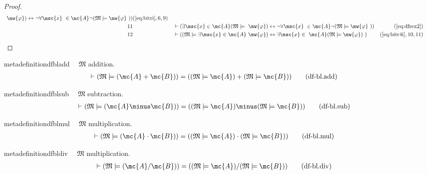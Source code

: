 \begin{proof}
\begin{align}
     ~\mw{\varphi} ) \leftrightarrow \lnot \forall \msc{x}
     ~\in \mc{A} \lnot ( \mathfrak{M} \models \mw{\varphi}
     ~) )&(\mbox{\ref{eq:bitri}},6,9)\notag
  \\ 11 &&  & \vdash ( \exists \msc{x} \in \mc{A} ( \mathfrak{M} \models
     ~\mw{\varphi} ) \leftrightarrow \lnot \forall \msc{x}
     ~\in \mc{A} \lnot ( \mathfrak{M} \models \mw{\varphi}
     ~) )&(\mbox{\ref{eq:dfrex2}})\notag
  \\ 12 &&  & \vdash ( ( \mathfrak{M} \models \exists \msc{x} \in \mc{A}
     ~\mw{\varphi} ) \leftrightarrow \exists \msc{x} \in
     ~\mc{A} ( \mathfrak{M} \models \mw{\varphi} )
     ~)&(\mbox{\ref{eq:bitr4i}},10,11)\notag
\end{align}
\end{proof}

\begin{restatable}{metadefinition}{dfbladd}~~ $\mathfrak{M}$ addition.
\begin{align}
\vdash ( \mathfrak{M} \models ( \mc{A} + \mc{B} ) ) = ( ( \mathfrak{M} \models
    \mc{A} ) + ( \mathfrak{M} \models \mc{B} )
    )\label{eq:df-bl.add}\tag{df-bl.add}
\end{align}
\end{restatable}

\begin{restatable}{metadefinition}{dfblsub}~~ $\mathfrak{M}$ subtraction.
\begin{align}
\vdash ( \mathfrak{M} \models ( \mc{A} \minus \mc{B} ) ) = ( ( \mathfrak{M}
    \models \mc{A} ) \minus ( \mathfrak{M} \models \mc{B} )
    )\label{eq:df-bl.sub}\tag{df-bl.sub}
\end{align}
\end{restatable}

\begin{restatable}{metadefinition}{dfblmul}~~ $\mathfrak{M}$ multiplication.
\begin{align}
\vdash ( \mathfrak{M} \models ( \mc{A} \cdot \mc{B} ) ) = ( ( \mathfrak{M}
    \models \mc{A} ) \cdot ( \mathfrak{M} \models \mc{B} )
    )\label{eq:df-bl.mul}\tag{df-bl.mul}
\end{align}
\end{restatable}

\begin{restatable}{metadefinition}{dfbldiv}~~ $\mathfrak{M}$ multiplication.
\begin{align}
\vdash ( \mathfrak{M} \models ( \mc{A} / \mc{B} ) ) = ( ( \mathfrak{M} \models
    \mc{A} ) / ( \mathfrak{M} \models \mc{B} )
    )\label{eq:df-bl.div}\tag{df-bl.div}
\end{align}
\end{restatable}

